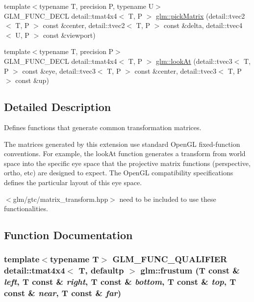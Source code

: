 \begin{CompactItemize}
\item 
{\footnotesize template$<$typename T, precision P, typename U$>$ }\\GLM\_\-FUNC\_\-DECL detail::tmat4x4$<$ T, P $>$ \hyperlink{group__gtc__matrix__transform_g42972db8a1c73829999a8454d11fa4a3}{glm::pickMatrix} (detail::tvec2$<$ T, P $>$ const \&center, detail::tvec2$<$ T, P $>$ const \&delta, detail::tvec4$<$ U, P $>$ const \&viewport)
\item 
{\footnotesize template$<$typename T, precision P$>$ }\\GLM\_\-FUNC\_\-DECL detail::tmat4x4$<$ T, P $>$ \hyperlink{group__gtc__matrix__transform_g7f4f81d4b0d7b492112eb4d5b184d9be}{glm::lookAt} (detail::tvec3$<$ T, P $>$ const \&eye, detail::tvec3$<$ T, P $>$ const \&center, detail::tvec3$<$ T, P $>$ const \&up)
\end{CompactItemize}


\subsection{Detailed Description}
Defines functions that generate common transformation matrices. 

The matrices generated by this extension use standard OpenGL fixed-function conventions. For example, the lookAt function generates a transform from world space into the specific eye space that the projective matrix functions (perspective, ortho, etc) are designed to expect. The OpenGL compatibility specifications defines the particular layout of this eye space.

$<$glm/gtc/matrix\_\-transform.hpp$>$ need to be included to use these functionalities. 

\subsection{Function Documentation}
\hypertarget{group__gtc__matrix__transform_g0ef39da6d6c83806dea5ff455eb225cf}{
\subsubsection[frustum]{\setlength{\rightskip}{0pt plus 5cm}template$<$typename T$>$ GLM\_\-FUNC\_\-QUALIFIER detail::tmat4x4$<$ T, defaultp $>$ glm::frustum (T const \& {\em left}, \/  T const \& {\em right}, \/  T const \& {\em bottom}, \/  T const \& {\em top}, \/  T const \& {\em near}, \/  T const \& {\em far})}}
\label{group__gtc__matrix__transform_g0ef39da6d6c83806dea5ff455eb225cf}


